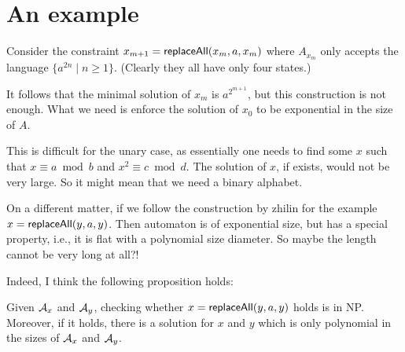 \documentclass{llncs}
\begin{document}
\appendix

\section{An example}

Consider the constraint $x_{m+1}=\mathsf{replaceAll}(x_m,a,x_m)$ where $A_{x_m}$ only accepts the language $\{a^{2n}\mid n\geq 1\}$. (Clearly they all have only four states.)

It follows that the minimal solution of $x_m$ is $a^{2^{m+1}}$, but this construction is not enough. What we need is enforce the solution of $x_0$ to be exponential in the size of $A$. 

This is difficult for the unary case, as essentially one needs to find some $x$ such that $x\equiv a \bmod b$ and $x^2 \equiv c\bmod d$. The solution of $x$, if exists, would not be very large. So it might mean that we need a binary alphabet. 

On a different matter, if we follow the construction by zhilin for the example $x=\mathsf{replaceAll}(y,a,y)$. Then automaton is of exponential size, but has a special property, i.e., it is flat with a polynomial size diameter. So maybe the length cannot be very long at all?!

Indeed, I think the following proposition holds:
\begin{proposition}
	Given $\mathcal{A}_x$ and $\mathcal{A}_y$, checking whether $x=\mathsf{replaceAll}(y,a,y)$ holds is in NP. Moreover, if it holds, there is a solution for $x$ and $y$ which is only polynomial in the sizes of $\mathcal{A}_x$ and $\mathcal{A}_y$. 
\end{proposition}	
 


\end{document}
